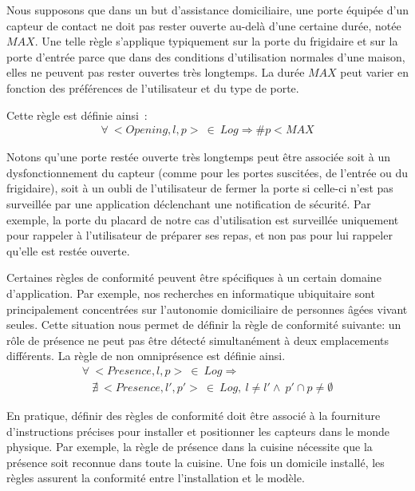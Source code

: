  Nous supposons que dans un but 
d'assistance domiciliaire, une porte équipée d'un capteur de contact ne doit 
pas rester ouverte au-delà d'une certaine durée, notée $MAX$. Une telle règle 
s'applique typiquement sur la porte du frigidaire et sur la porte d'entrée 
parce que dans des conditions d'utilisation normales d'une maison, elles ne 
peuvent pas rester ouvertes très longtemps. La durée $MAX$ 
peut varier en fonction des préférences de l'utilisateur et du type de porte.

Cette règle est définie ainsi~:
\begin{displaymath}\label{archi:algebra:example2}
  \begin{array}{c}
    \forall~<Opening, l, p>~\in~Log \Rightarrow  \# p < MAX
  \end{array}
\end{displaymath}

Notons qu'une porte restée ouverte très longtemps peut être associée soit à un dysfonctionnement du 
capteur (comme pour les portes suscitées, de l'entrée ou du frigidaire), soit à un oubli de l'utilisateur de fermer la porte si celle-ci 
n'est pas surveillée par une application déclenchant une notification de 
sécurité. Par exemple, la porte du placard de notre cas d'utilisation est 
surveillée uniquement pour rappeler à l'utilisateur de préparer ses repas, et non pas pour 
lui rappeler qu'elle est restée ouverte. 

 Certaines règles de conformité peuvent être 
spécifiques à un certain domaine d'application. Par exemple, 
nos recherches en informatique ubiquitaire sont principalement concentrées sur 
l'autonomie domiciliaire de personnes âgées vivant seules. Cette situation nous 
permet de définir la règle de conformité suivante: un rôle de présence ne peut 
pas être détecté simultanément à deux emplacements différents. La règle de non 
omniprésence est définie ainsi. 
\begin{displaymath}\label{archi:algebra:example3}
  \begin{array}{c}
    \forall~<Presence, l, p>~\in~Log \Rightarrow \\
     ~~~~\nexists~ <Presence, l', p'>~\in~Log,~l \neq l' \wedge ~p' \cap p \neq \emptyset
  \end{array}
\end{displaymath}

En pratique, définir des règles de conformité doit être associé à la fourniture d'instructions 
précises pour installer et positionner les capteurs dans le monde physique. 
Par exemple, la règle de présence dans la cuisine nécessite que la présence 
soit reconnue dans toute la cuisine. Une fois un domicile installé, les 
règles assurent la conformité entre l'installation et le modèle.

